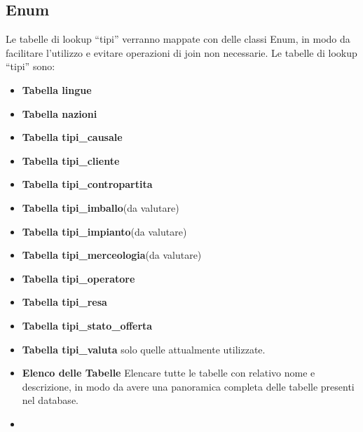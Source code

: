 \documentclass[12pt, a4paper]{article}
\begin{document}
\subsection{Enum}
Le tabelle di lookup ``tipi'' verranno mappate con delle classi Enum, in modo da facilitare l'utilizzo e evitare operazioni di join non necessarie.
Le tabelle di lookup ``tipi'' sono:
\begin{itemize}
    \item \textbf{Tabella lingue}
    \item \textbf{Tabella nazioni}
    \item \textbf{Tabella tipi\_causale}
    \item \textbf{Tabella tipi\_cliente}
    \item \textbf{Tabella tipi\_contropartita}
    \item \textbf{Tabella tipi\_imballo}(da valutare)
    \item \textbf{Tabella tipi\_impianto}(da valutare)
    \item \textbf{Tabella tipi\_merceologia}(da valutare)
    \item \textbf{Tabella tipi\_operatore}
    \item \textbf{Tabella tipi\_resa}
    \item \textbf{Tabella tipi\_stato\_offerta}
    \item \textbf{Tabella tipi\_valuta} solo quelle attualmente utilizzate.
    \item \textbf{Elenco delle Tabelle} Elencare tutte le tabelle con relativo nome e descrizione,
          in modo da avere una panoramica completa delle tabelle presenti nel database.
    \item \
\end{itemize}
\end{document}
